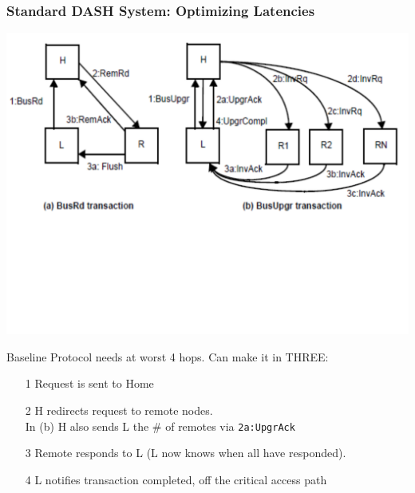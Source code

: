 \documentclass{beamer}
\renewcommand{\emph}[1]{\textcolor{structure}{#1}}
\newcommand{\emp}[1]{\textcolor{DikuRed}{ #1}}
\begin{document}
\begin{frame}[fragile,t]
\frametitle{Standard DASH System: Optimizing Latencies}

\includegraphics[width=55ex]{FigsInfCoherence/RedLatencyCCNUMA}
\vspace{-15ex}

Baseline Protocol needs at worst 4 hops. 
\emph{Can make it in THREE}:\pause
\begin{itemize}
    \item[1] Request is sent to Home
    \item[2] H redirects request to remote nodes.\\ 
             In (b) H also sends L the \# of remotes via {\tt 2a:UpgrAck}
    \item[3] Remote responds to L (L now knows when all have responded).\medskip
    \item[4] L notifies transaction completed, \emp{off the critical access path}
\end  {itemize}

\end{frame}
\end{document}
